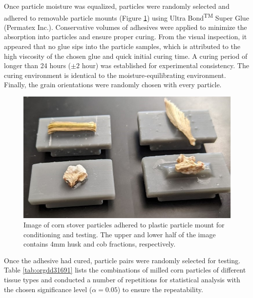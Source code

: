 \documentclass[xcolor=dvipsnames,10pt,hidelinks]{article}
\begin{document}
Once particle moisture was equalized, particles were randomly selected and adhered to removable particle mounts (Figure \ref{fig:org4d729cc}) using Ultra Bond\textsuperscript{TM} Super Glue (Permatex Inc.).
Conservative volumes of adhesives were applied to minimize the absorption into particles and ensure proper curing.
From the visual inspection, it appeared that no glue sips into the particle samples,
which is attributed to the high viscosity of the chosen glue and quick initial curing time.
A curing period of longer than 24 hours (\(\pm 2\) hour) was established for experimental consistency.
The curing environment is identical to the moisture-equilibrating environment.
Finally, the grain orientations were randomly chosen with every particle.

\begin{figure}[htbp]
\centering
\includegraphics[width=.9\linewidth]{figures/image4.jpg}
\caption{\label{fig:org4d729cc}Image of corn stover particles adhered to plastic particle mount for conditioning and testing. The upper and lower half of the image contains 4mm husk and cob fractions, respectively.}
\end{figure}

Once the adhesive had cured, particle pairs were randomly selected for testing.
Table \ref{tab:orgdd31691} lists the combinations of milled corn particles of different tissue types and conducted a number of repetitions for statistical analysis with the chosen significance level (\(\alpha = 0.05\)) to ensure the repeatability.
\end{document}

